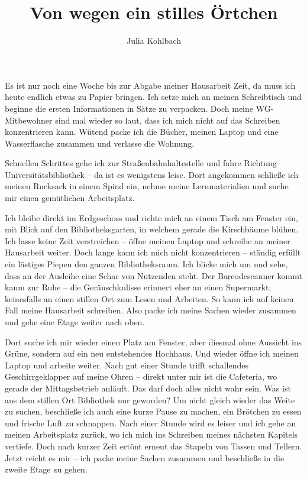 \documentclass[a4paper,
fontsize=11pt,
oneside,
numbers=noperiodatend,
parskip=half-,
bibliography=totoc,
final
]{scrartcl}
\title{\LARGE{Von wegen ein stilles Örtchen}}%
\author{Julia Kohlbach} %
\date{}
\begin{document}
\maketitle
\thispagestyle{fancyplain} 


Es ist nur noch eine Woche bis zur Abgabe meiner Hausarbeit Zeit, da
muss ich heute endlich etwas zu Papier bringen. Ich setze mich an meinen
Schreibtisch und beginne die ersten Informationen in Sätze zu verpacken.
Doch meine WG-Mitbewohner sind mal wieder so laut, dass ich mich nicht
auf das Schreiben konzentrieren kann. Wütend packe ich die Bücher,
meinen Laptop und eine Wasserflasche zusammen und verlasse die Wohnung.

Schnellen Schrittes gehe ich zur Straßenbahnhaltestelle und fahre
Richtung Universitätsbibliothek -- da ist es wenigstens leise. Dort
angekommen schließe ich meinen Rucksack in einem Spind ein, nehme meine
Lernmaterialien und suche mir einen gemütlichen Arbeitsplatz.

Ich bleibe direkt im Erdgeschoss und richte mich an einem Tisch am
Fenster ein, mit Blick auf den Bibliotheksgarten, in welchem gerade die
Kirschbäume blühen. Ich lasse keine Zeit verstreichen -- öffne meinen
Laptop und schreibe an meiner Hausarbeit weiter. Doch lange kann ich
mich nicht konzentrieren -- ständig erfüllt ein lästiges Piepen den
ganzen Bibliotheksraum. Ich blicke mich um und sehe, dass an der
Ausleihe eine Schar von Nutzenden steht. Der Barcodescanner kommt kaum
zur Ruhe -- die Geräuschkulisse erinnert eher an einen Supermarkt;
keinesfalls an einen stillen Ort zum Lesen und Arbeiten. So kann ich auf
keinen Fall meine Hausarbeit schreiben. Also packe ich meine Sachen
wieder zusammen und gehe eine Etage weiter nach oben.

Dort suche ich mir wieder einen Platz am Fenster, aber diesmal ohne
Aussicht ins Grüne, sondern auf ein neu entstehendes Hochhaus. Und
wieder öffne ich meinen Laptop und arbeite weiter. Nach gut einer Stunde
trifft schallendes Geschirrgeklapper auf meine Ohren -- direkt unter mir
ist die Cafeteria, wo gerade der Mittagsbetrieb anläuft. Das darf doch
alles nicht wahr sein. Was ist aus dem stillen Ort Bibliothek nur
geworden? Um nicht gleich wieder das Weite zu suchen, beschließe ich
auch eine kurze Pause zu machen, ein Brötchen zu essen und frische Luft
zu schnappen. Nach einer Stunde wird es leiser und ich gehe an meinen
Arbeitsplatz zurück, wo ich mich ins Schreiben meines nächsten Kapitels
vertiefe. Doch nach kurzer Zeit ertönt erneut das Stapeln von Tassen und
Tellern. Jetzt reicht es mir -- ich packe meine Sachen zusammen und
beschließe in die zweite Etage zu gehen.
\end{document}
